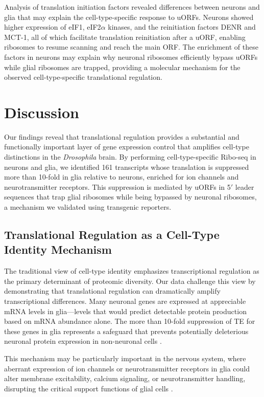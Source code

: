 \documentclass[12pt]{article}
\begin{document}
Analysis of translation initiation factors revealed differences between neurons and glia that may explain the cell-type-specific response to uORFs. Neurons showed higher expression of eIF1, eIF2$\alpha$ kinases, and the reinitiation factors DENR and MCT-1, all of which facilitate translation reinitiation after a uORF, enabling ribosomes to resume scanning and reach the main ORF. The enrichment of these factors in neurons may explain why neuronal ribosomes efficiently bypass uORFs while glial ribosomes are trapped, providing a molecular mechanism for the observed cell-type-specific translational regulation.

\section{Discussion}

Our findings reveal that translational regulation provides a substantial and functionally important layer of gene expression control that amplifies cell-type distinctions in the \textit{Drosophila} brain. By performing cell-type-specific Ribo-seq in neurons and glia, we identified 161 transcripts whose translation is suppressed more than 10-fold in glia relative to neurons, enriched for ion channels and neurotransmitter receptors. This suppression is mediated by uORFs in 5$'$ leader sequences that trap glial ribosomes while being bypassed by neuronal ribosomes, a mechanism we validated using transgenic reporters.

\subsection{Translational Regulation as a Cell-Type Identity Mechanism}

The traditional view of cell-type identity emphasizes transcriptional regulation as the primary determinant of proteomic diversity. Our data challenge this view by demonstrating that translational regulation can dramatically amplify transcriptional differences. Many neuronal genes are expressed at appreciable mRNA levels in glia---levels that would predict detectable protein production based on mRNA abundance alone. The more than 10-fold suppression of TE for these genes in glia represents a safeguard that prevents potentially deleterious neuronal protein expression in non-neuronal cells \citep{schwanhausser2011global, brar2015beyond}.

This mechanism may be particularly important in the nervous system, where aberrant expression of ion channels or neurotransmitter receptors in glia could alter membrane excitability, calcium signaling, or neurotransmitter handling, disrupting the critical support functions of glial cells \citep{freeman2015drosophila, stork2014analysis}.
\end{document}
